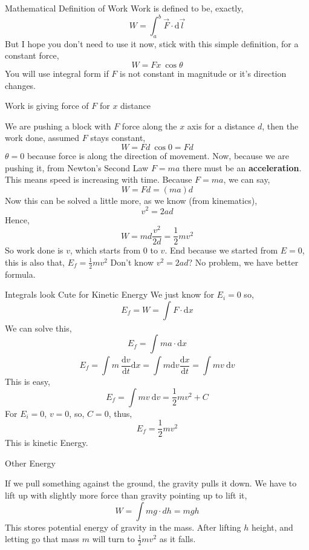 \documentclass[9pt,serif]{beamer}
\newcommand{\draw}[3]{ \begin{figure}[hbt!] \centering
 \fontsize{35pt}{20pt}\selectfont \resizebox{#1 \textwidth}{!}{
{#2.pdf_tex}}\caption{#3} \label{#3} \end{figure} }
\newcommand{\sides}[2]{ \begin{minipage}{0.5\textwidth} #1
    \end{minipage}\hfill%
\begin{minipage}{0.5\textwidth} #2 \end{minipage} }
\begin{document}
\begin{frame}
    {Mathematical Definition of Work}
    Work is defined to be, exactly, 
    \[ W = \int_{a}^{b} \vec F \cdot \mathrm d \vec l \]
    But I hope you don't need to use it now, stick with this simple definition, for a constant force, 
    \[ W = F x \ \cos \theta \]
    You will use integral form if $F$ is not constant in magnitude or it's direction changes.
\end{frame}





\begin{frame}
    {Work is giving force of $F$ for $x$ distance}
    \begin{small}    We are pushing a block with $F$ force along the $x$ axis for a distance $d$, then the work done, assumed $F$ stays constant, 
    \[ W = F d \ \cos 0 = F d \] \pause
    $\theta = 0$ because force is along the direction of movement. Now, because we are pushing it, from Newton's Second Law $F = ma$ there must be an \textbf{acceleration}. \\ \pause
This means speed is increasing with time. Because $F = ma$, we can say, 
\[ W = F d = \left( m a \right) d \]
Now this can be solved a little more, as we know (from kinematics), \[ v^2 = 2 a d \]
Hence, 
\[ W = md \frac{v^2}{2d} = \frac{1}{2} m v^2 \] \pause
So work done is $v$, which starts from $0$ to $v$. End because we started from $E=0$, this is also that, 
$E _f = \frac{1}{2} mv^2$
Don't know $v^2 = 2ad$? No problem, we have better formula. \end{small}
\end{frame}



\begin{frame}{Integrals look Cute for Kinetic Energy}
    We just know for $E_i =0$ so, 
    \[ E_f = W = \int_{}^{} F \cdot \mathrm d x   \]
    We can solve this, 
    \[ E_f = \int_{}^{}  m a \cdot \mathrm d x  \]
    \[ E_f = \int m \ \frac{\mathrm d v}{\mathrm d t} \mathrm d x = \int 
    m \mathrm d v \frac{\mathrm d x}{\mathrm d t} = \int m v  \ \mathrm d v\]
    This is easy, 
    \[ E_f = \int m v \ \mathrm d v = \frac{1}{2} mv^2 + C \]
    For $E_i = 0$, $v = 0$, so, $C = 0$, thus, 
    \[ E_f = \frac{1}{2 }m v^2 \]
    This is kinetic Energy.
\end{frame}

\begin{frame}
    {Other Energy} 
    \sides{    If we pull something against the ground, the gravity pulls it down.
            We have to lift up with slightly more force than gravity pointing up to lift it, 
            \[ W= \int mg \cdot dh = mgh \]
            This stores potential energy of gravity in the mass. After lifting $h$ height, and letting go that mass $m$ will turn to $\frac{1}{2 }mv^2$ as it falls.
            }{ \draw{0.9}{work_grav}{}
    }  
\end{frame}
    
\end{document}
